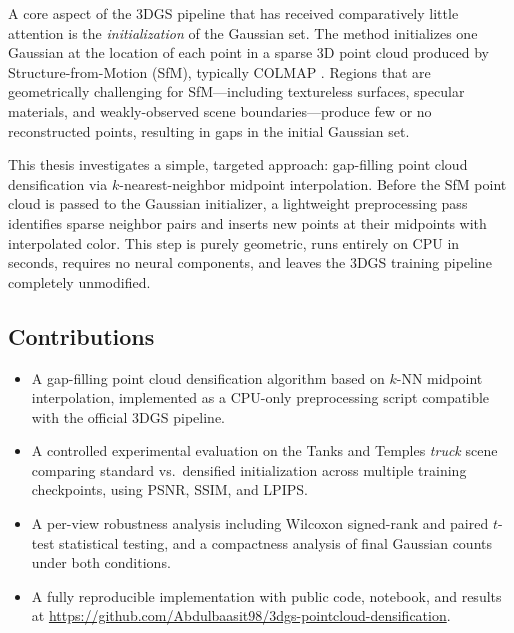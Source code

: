 \documentclass[12pt, a4paper]{article}
\begin{document}
A core aspect of the 3DGS pipeline that has received comparatively little attention
is the \textit{initialization} of the Gaussian set. The method initializes one
Gaussian at the location of each point in a sparse 3D point cloud produced by
Structure-from-Motion (SfM), typically COLMAP \citep{schonberger2016sfm}. Regions
that are geometrically challenging for SfM---including textureless surfaces,
specular materials, and weakly-observed scene boundaries---produce few or no
reconstructed points, resulting in gaps in the initial Gaussian set.

This thesis investigates a simple, targeted approach: gap-filling point cloud
densification via $k$-nearest-neighbor midpoint interpolation. Before the SfM
point cloud is passed to the Gaussian initializer, a lightweight preprocessing pass
identifies sparse neighbor pairs and inserts new points at their midpoints with
interpolated color. This step is purely geometric, runs entirely on CPU in seconds,
requires no neural components, and leaves the 3DGS training pipeline completely
unmodified.

\subsection{Contributions}

\begin{itemize}
    \item A gap-filling point cloud densification algorithm based on $k$-NN
    midpoint interpolation, implemented as a CPU-only preprocessing script
    compatible with the official 3DGS pipeline.

    \item A controlled experimental evaluation on the Tanks and Temples
    \textit{truck} scene comparing standard vs.\ densified initialization
    across multiple training checkpoints, using PSNR, SSIM, and LPIPS.

    \item A per-view robustness analysis including Wilcoxon signed-rank and
    paired $t$-test statistical testing, and a compactness analysis of
    final Gaussian counts under both conditions.

    \item A fully reproducible implementation with public code, notebook,
    and results at \url{https://github.com/Abdulbaasit98/3dgs-pointcloud-densification}.
\end{itemize}

\end{document}
